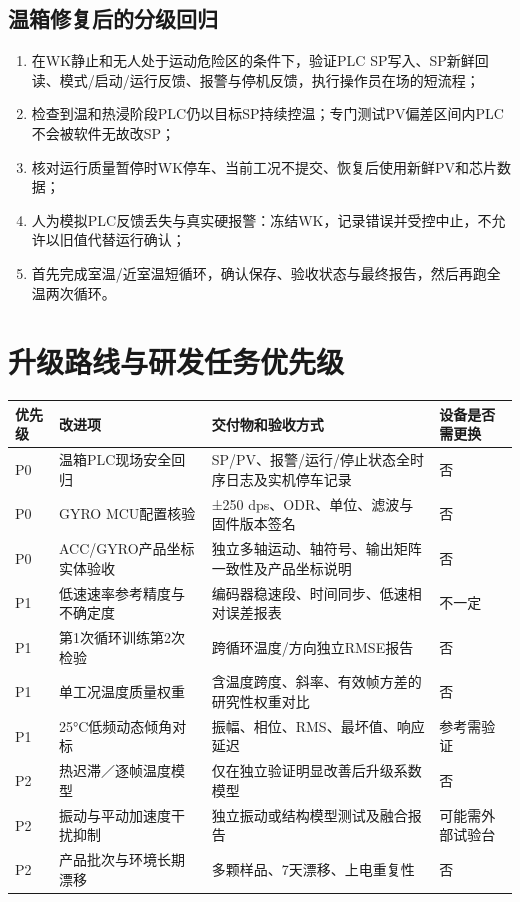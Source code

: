 \documentclass[UTF8,a4paper,11pt,oneside,openany,fontset=none]{ctexbook}
\begin{document}
\section{温箱修复后的分级回归}
\begin{enumerate}
\item 在WK静止和无人处于运动危险区的条件下，验证PLC SP写入、SP新鲜回读、模式/启动/运行反馈、报警与停机反馈，执行操作员在场的短流程；
\item 检查到温和热浸阶段PLC仍以目标SP持续控温；专门测试PV偏差区间内PLC不会被软件无故改SP；
\item 核对运行质量暂停时WK停车、当前工况不提交、恢复后使用新鲜PV和芯片数据；
\item 人为模拟PLC反馈丢失与真实硬报警：冻结WK，记录错误并受控中止，不允许以旧值代替运行确认；
\item 首先完成室温/近室温短循环，确认保存、验收状态与最终报告，然后再跑全温两次循环。
\end{enumerate}

\chapter{升级路线与研发任务优先级}
\begin{longtable}{p{1.15cm}p{4.3cm}p{5.45cm}p{2.3cm}}
\toprule 优先级 & 改进项 & 交付物和验收方式 & 设备是否需更换\\\midrule\endhead
P0 & 温箱PLC现场安全回归 & SP/PV、报警/运行/停止状态全时序日志及实机停车记录 & 否\\
P0 & GYRO MCU配置核验 & ±250 dps、ODR、单位、滤波与固件版本签名 & 否\\
P0 & ACC/GYRO产品坐标实体验收 & 独立多轴运动、轴符号、输出矩阵一致性及产品坐标说明 & 否\\
P1 & 低速速率参考精度与不确定度 & 编码器稳速段、时间同步、低速相对误差报表 & 不一定\\
P1 & 第1次循环训练第2次检验 & 跨循环温度/方向独立RMSE报告 & 否\\
P1 & 单工况温度质量权重 & 含温度跨度、斜率、有效帧方差的研究性权重对比 & 否\\
P1 & 25°C低频动态倾角对标 & 振幅、相位、RMS、最坏值、响应延迟 & 参考需验证\\
P2 & 热迟滞／逐帧温度模型 & 仅在独立验证明显改善后升级系数模型 & 否\\
P2 & 振动与平动加速度干扰抑制 & 独立振动或结构模型测试及融合报告 & 可能需外部试验台\\
P2 & 产品批次与环境长期漂移 & 多颗样品、7天漂移、上电重复性 & 否\\\bottomrule
\end{longtable}
\end{document}

